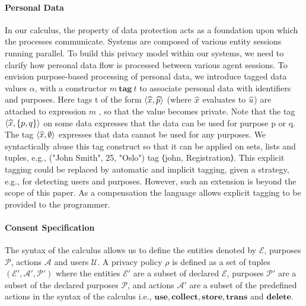  \paragraph{Personal Data} In our calculus, the property of data protection acts as a foundation upon which the processes communicate. Systems are composed of various entity sessions running parallel. 
To build this privacy model within our systems, we need to clarify how personal data flow is processed between various agent sessions. To envision purpose-based processing of personal data, we introduce tagged data values $\alpha$,  with a constructor $ m \ \textbf{tag} \  t $ to associate personal data with identifiers and purposes. Here tags t of the form  $ \langle  \widehat{x} , \widehat{p}  \rangle $ (where $ \widehat{x} $ evaluates to $ \widehat{u}$) are attached to expression $m$ , so that the value becomes private. Note that the tag $ \langle \widehat{x} , \{ p, q \}\rangle $ on some data expresses that the data can be used for purpose p or q. The tag $ \langle \widehat{x} , \emptyset \rangle $ expresses that data cannot be used for any purposes. We syntactically abuse this tag construct so that it can be applied on sets, lists and tuples, e.g., ("John Smith", 25, "Oslo") tag ⟨{john}, {Registration}⟩. This explicit tagging could be replaced by automatic and implicit tagging, given a strategy, e.g., for detecting users and purposes. However, such an extension is beyond the scope of this paper.
As a compensation the language allows explicit tagging to be provided to the programmer.













\paragraph{Consent Specification}
The syntax of the calculus allows us to define the entities denoted by $ \mathcal{E} $, purposes $\mathcal{P} $, actions  $ \mathcal{A} $ and users $ \mathcal{U} $. A privacy policy $ \rho$ is defined as a set of tuples $ (\mathcal{E}',  \mathcal{A}' , \mathcal{P}')$ where the entities $ \mathcal{E}'$ are a subset of declared $ \mathcal{E} $, purposes $ \mathcal{P}'$ are a subset of the declared purposes $\mathcal{P}$, and actions $ \mathcal{A}' $ are a subset of the predefined actions in the syntax of the calculus i.e., $ \textbf{use},\textbf{collect}, \textbf{store}, \textbf{trans} $ and $ \textbf{delete}$. 

